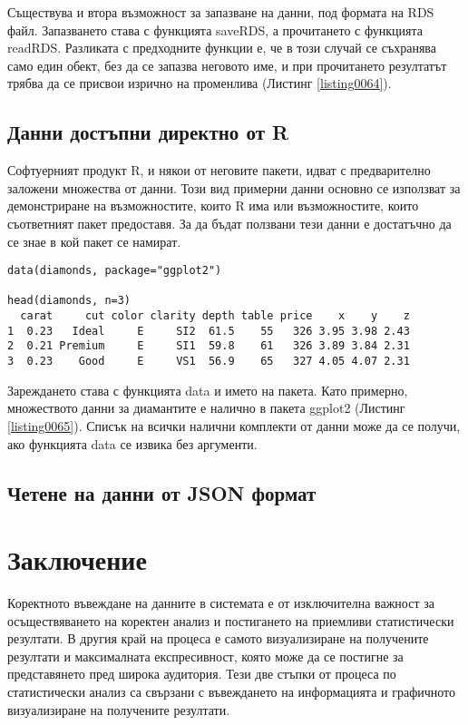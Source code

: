 Съществува и втора възможност за запазване на данни, под формата на RDS файл. Запазването става с функцията saveRDS, а прочитането с функцията readRDS. Разликата с предходните функции е, че в този случай се съхранява само един обект, без да се запазва неговото име, и при прочитането резултатът трябва да се присвои изрично на променлива (Листинг \ref{listing0064}). 

\subsection{Данни достъпни директно от R}

Софтуерният продукт R, и някои от неговите пакети, идват с предварително заложени множества от данни. Този вид примерни данни основно се използват за демонстриране на възможностите, които R има или възможностите, които съответният пакет предоставя. За да бъдат ползвани тези данни е достатъчно да се знае в кой пакет се намират.

\begin{lstlisting}[caption=Зареждане на примерни данни, label=listing0065]
data(diamonds, package="ggplot2")

head(diamonds, n=3)
  carat     cut color clarity depth table price    x    y    z
1  0.23   Ideal     E     SI2  61.5    55   326 3.95 3.98 2.43
2  0.21 Premium     E     SI1  59.8    61   326 3.89 3.84 2.31
3  0.23    Good     E     VS1  56.9    65   327 4.05 4.07 2.31
\end{lstlisting}

Зареждането става с функцията data и името на пакета. Като примерно, множеството данни за диамантите е налично в пакета ggplot2 (Листинг \ref{listing0065}). Списък на всички налични комплекти от данни може да се получи, ако функцията data се извика без аргументи. 

\subsection{Четене на данни от JSON формат}

\section*{Заключение}

Коректното въвеждане на данните в системата е от изключителна важност за осъществяването на коректен анализ и постигането на приемливи статистически резултати. В другия край на процеса е самото визуализиране на получените резултати и максималната експресивност, която може да се постигне за представянето пред широка аудитория. Тези две стъпки от процеса по статистически анализ са свързани с въвеждането на информацията и графичното визуализиране на получените резултати. 

